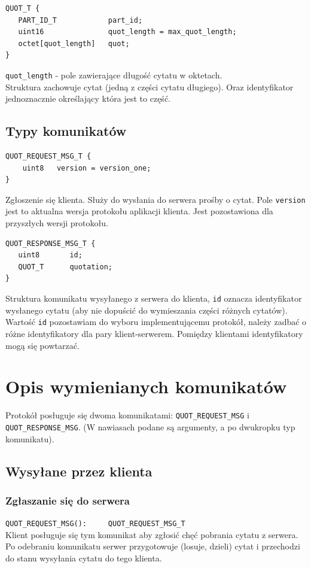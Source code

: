 \documentclass{article}
\begin{document}
\begin{verbatim}
QUOT_T {
   PART_ID_T            part_id;
   uint16               quot_length = max_quot_length;
   octet[quot_length]   quot;
}
\end{verbatim}
\verb+quot_length+ - pole zawierające długość cytatu w oktetach.\\
Struktura zachowuje cytat (jedną z części cytatu długiego). Oraz identyfikator jednoznacznie określający która jest to część.

\subsection{Typy komunikatów}
\begin{verbatim}
QUOT_REQUEST_MSG_T {
    uint8   version = version_one;
}
\end{verbatim}
Zgłoszenie się klienta.
Służy do wysłania do serwera prośby o cytat.
Pole \verb+version+ jest to aktualna wersja protokołu aplikacji klienta.
Jest pozostawiona dla przyszłych wersji protokołu.

\begin{verbatim}
QUOT_RESPONSE_MSG_T {
   uint8       id;
   QUOT_T      quotation;
}
\end{verbatim}
Struktura komunikatu wysyłanego z serwera do klienta, \verb+id+ oznacza identyfikator wysłanego
cytatu (aby nie dopuścić do wymieszania części różnych cytatów). Wartość \verb+id+ pozostawiam do wyboru implementującemu
protokół, należy zadbać o różne identyfikatory dla pary klient-serwerem. Pomiędzy klientami
identyfikatory mogą się powtarzać.



\section{Opis wymienianych komunikatów}
Protokół posługuje się dwoma komunikatami: \verb+QUOT_REQUEST_MSG+ i \verb+QUOT_RESPONSE_MSG+. 
(W nawiasach podane są argumenty, a po dwukropku typ komunikatu).
\subsection{Wysyłane przez klienta}
\subsubsection{Zgłaszanie się do serwera}
\verb+QUOT_REQUEST_MSG():     QUOT_REQUEST_MSG_T+\\
Klient posługuje się tym komunikat aby zgłosić chęć pobrania cytatu z serwera.
Po odebraniu komunikatu serwer przygotowuje (losuje, dzieli) cytat i przechodzi do stanu wysyłania cytatu do tego klienta.
\end{document}
